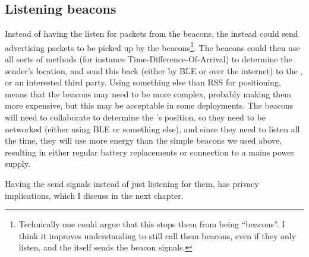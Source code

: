 \subsection{Listening beacons}
Instead of having the \device listen for packets from the beacons, the \device instead could send advertising packets to be picked up by the beacons\footnote{Technically one could argue that this stops them from being ``beacons''.  I think it improves understanding to still call them beacons, even if they only listen, and the \device itself sends the beacon signals.}.
The beacons could then use all sorts of methods (for instance Time-Difference-Of-Arrival) to determine the sender's location, and send this back (either by BLE or over the internet) to the \device, or an interested third party.
Using something else than RSS for positioning, means that the beacons may need to be more complex, probably making them more expensive, but this may be acceptable in some deployments.
The beacons will need to collaborate to determine the \device's position, so they need to be networked (either using BLE or something else), and since they need to listen all the time, they will use more energy than the simple beacons we used above, resulting in either regular battery replacements or connection to a mains power supply.

Having the \device send signals instead of just listening for them, has privacy implications, which I discuss in the next chapter.

